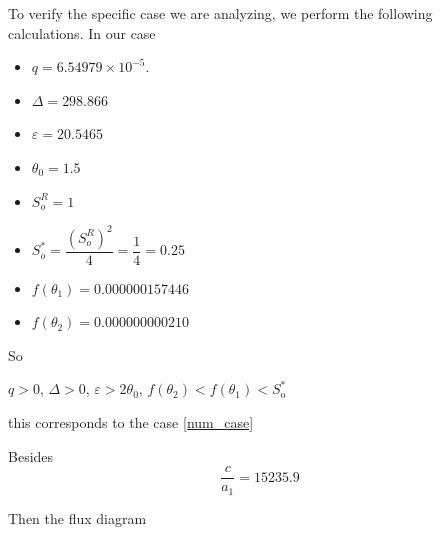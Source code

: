 \newpage
To verify the specific case we are analyzing, we perform the following calculations.
In our case
\begin{itemize}
	\item $q=6.54979\times 10^{-5}$.
	\item $\Delta=298.866$
	\item  $\varepsilon = 20.5465$
	\item 	$\theta_0 =1.5 $
	\item $S_o^R=1$
	\item $  S_o^* = \dfrac{  ( S_o^R)^2 }{4}  = \dfrac{1}{4}=0.25$
	\item $ f(\theta_1)= 0.000000157446 $
	\item $ f(\theta_2)= 0.000000000210 $
\end{itemize}
So

$q>0$, $\Delta>0$, $\varepsilon>2\theta_{0}$,
$f(\theta_2)<f(\theta_{1})<S_{\text{o}}^{\ast}$

this corresponds to the case \ref{num_case}

Besides
\[  \dfrac{c}{a_1} = 15235.9  \]

Then the flux diagram

